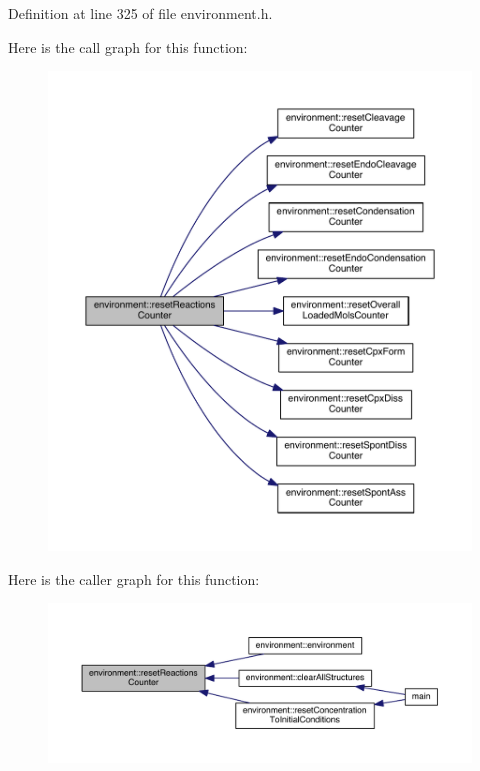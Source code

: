 Definition at line 325 of file environment.\+h.



Here is the call graph for this function\+:\nopagebreak
\begin{figure}[H]
\begin{center}
\leavevmode
\includegraphics[width=350pt]{a00013_a5c8713237992b28c39199a7aea3f9ea0_cgraph}
\end{center}
\end{figure}




Here is the caller graph for this function\+:\nopagebreak
\begin{figure}[H]
\begin{center}
\leavevmode
\includegraphics[width=350pt]{a00013_a5c8713237992b28c39199a7aea3f9ea0_icgraph}
\end{center}
\end{figure}


